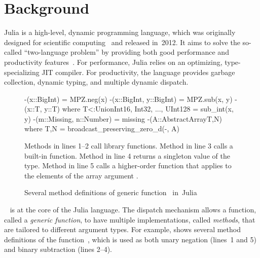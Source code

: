 \chapter{Background} %
\label{chap:background}


Julia is a high-level, dynamic programming language, which was originally
designed for scientific computing~\cite{bib:bezanson:julia-fresh:2017}
and released in~2012.
It aims to solve the so-called ``two-language problem''
by providing both good performance and productivity
features~\cite{bib:bezanson:julia-dyn-perf:oopsla:2018}.
For performance, Julia relies on an optimizing, type-specializing JIT compiler.
For productivity, the language provides garbage collection, dynamic typing, and
multiple dynamic dispatch.

\begin{figure}[t]
\begin{julia}
-(x::BigInt) = MPZ.neg(x)
-(x::BigInt, y::BigInt) = MPZ.sub(x, y)
-(x::T, y::T) where T<:Union{Int16, Int32, ..., UInt128} = sub_int(x, y)
-(m::Missing, n::Number) = missing
-(A::AbstractArray{T,N}) where {T,N} = broadcast_preserving_zero_d(-, A)
\end{julia}
\caption{Several method definitions of generic function~\cjl{(-)} in~Julia
}\label{fig:code:subtraction}
\begin{tablenotes}[para]
\small
Methods in lines 1--2 call library functions.
Method in line 3 calls a built-in function.
Method in line 4 returns a singleton value  of the  type.
Method in line 5 calls a higher-order function that applies \cjl{(-)} to the
elements of the array argument .
\end{tablenotes}
\end{figure}

~\cite{bib:bobrow:common-loops:1986,%
bib:chambers:multi-cecil:1992} is at the core of the Julia language.
The dispatch mechanism allows a function, called a \emph{generic
function}, to have multiple implementations, called \emph{methods}, that are
tailored to different argument types. For example, 
shows several method definitions of the function~\cjl{(-)},
which is used as both unary negation (lines~1 and 5)
and binary subtraction (lines 2--4).


